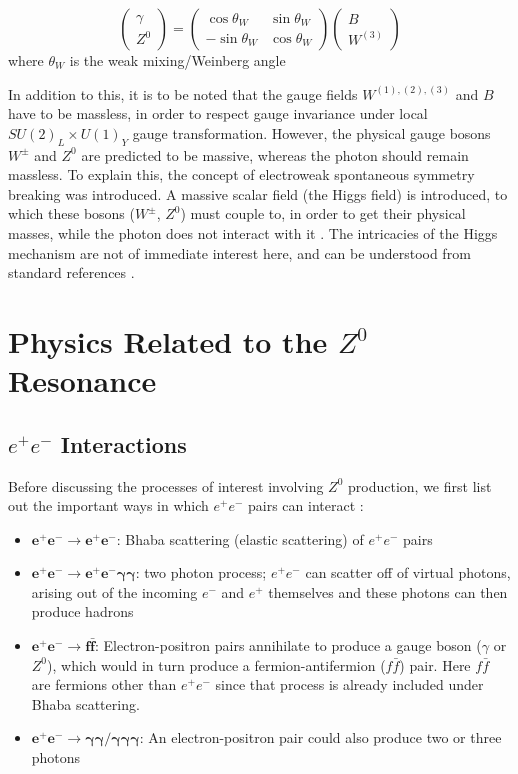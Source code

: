 \begin{equation}
\begin{pmatrix} 
\gamma \\ 
Z^{0} 
\end{pmatrix}
= 
\begin{pmatrix}
\cos \theta_{W} & \sin \theta_{W} \\
-\sin \theta_{W} & \cos \theta_{W} 
\end{pmatrix}
\begin{pmatrix}
B \\
W^{(3)}
\end{pmatrix}
\end{equation}
where $\theta_{W}$ is the weak mixing/Weinberg angle

In addition to this, it is to be noted that the gauge fields $W^{(1),(2),(3)}$ and $B$ have to be massless, in order to respect gauge invariance under local $SU(2)_{L}\times U(1)_{Y}$ gauge transformation. However, the physical gauge bosons $W^{\pm}$ and $Z^{0}$ are predicted to be massive, whereas the photon should remain massless. To explain this, the concept of electroweak spontaneous symmetry breaking was introduced. A massive scalar field (the Higgs field) is introduced, to which these bosons ($W^{\pm}$, $Z^{0}$) must couple to, in order to get their physical masses, while the photon does not interact with it \cite{Dooling:207610}. The intricacies of the Higgs mechanism are not of immediate interest here, and can be understood from standard references \cite{thomson_2013, Griffiths:111880}.

\section{Physics Related to the $Z^{0}$ Resonance}
\subsection{$e^{+}e^{-}$ Interactions}
Before discussing the processes of interest involving $Z^{0}$ production, we first list out the important ways in which $e^{+}e^{-}$ pairs can interact \cite{UB}:
\begin{itemize}
\item $\bm{e^{+}e^{-}\rightarrow e^{+}e^{-}}$: Bhaba scattering (elastic scattering) of $e^{+}e^{-}$ pairs 
\item $\bm{e^{+}e^{-}\rightarrow e^{+}e^{-}\gamma \gamma}$: two photon process; $e^{+}e^{-}$ can scatter off of virtual photons, arising out of the incoming $e^{-}$ and $e^{+}$ themselves and these photons can then produce hadrons
\item $\bm{e^{+}e^{-}\rightarrow f \bar{f}}$: Electron-positron pairs annihilate to produce a gauge boson ($\gamma$ or $Z^{0}$), which would in turn produce a fermion-antifermion ($f\bar{f}$) pair. Here $f\bar{f}$ are fermions other than $e^{+}e^{-}$ since that process is already included under Bhaba scattering.
\item $\bm{e^{+}e^{-}\rightarrow \gamma \gamma / \gamma \gamma \gamma}$: An electron-positron pair could also produce two or three photons 
\end{itemize}

